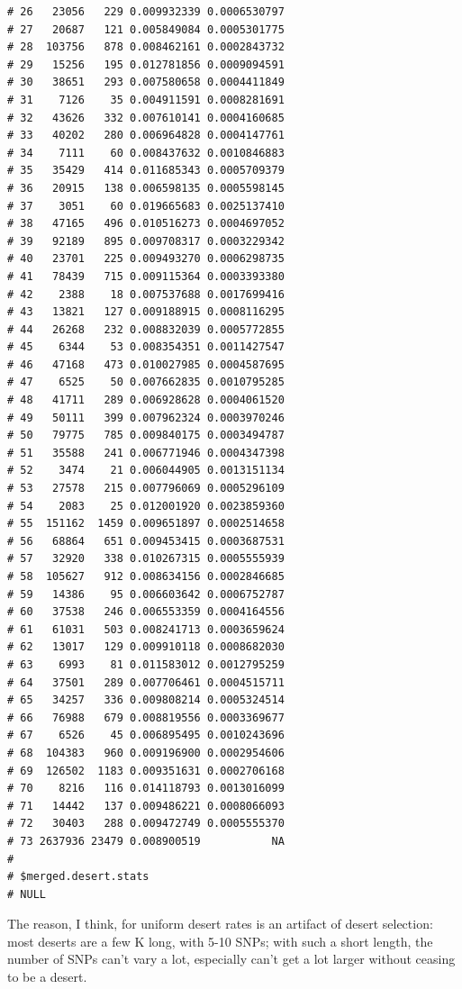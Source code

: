 \documentclass{article}\usepackage[]{graphicx}\usepackage[]{color}
\makeatletter
\newenvironment{kframe}{%
 \def\at@end@of@kframe{}%
 \ifinner\ifhmode%
  \def\at@end@of@kframe{\end{minipage}}%
  \begin{minipage}{\columnwidth}%
 \fi\fi%
 \def\FrameCommand##1{\hskip\@totalleftmargin \hskip-\fboxsep
 \colorbox{shadecolor}{##1}\hskip-\fboxsep
     \hskip-\linewidth \hskip-\@totalleftmargin \hskip\columnwidth}%
 \MakeFramed {\advance\hsize-\width
   \@totalleftmargin\z@ \linewidth\hsize
   \@setminipage}}%
 {\par\unskip\endMakeFramed%
 \at@end@of@kframe}
\newenvironment{knitrout}{}{} %
\makeatother
\begin{document}
\begin{knitrout}
\begin{kframe}
\begin{verbatim}
# 26   23056   229 0.009932339 0.0006530797
# 27   20687   121 0.005849084 0.0005301775
# 28  103756   878 0.008462161 0.0002843732
# 29   15256   195 0.012781856 0.0009094591
# 30   38651   293 0.007580658 0.0004411849
# 31    7126    35 0.004911591 0.0008281691
# 32   43626   332 0.007610141 0.0004160685
# 33   40202   280 0.006964828 0.0004147761
# 34    7111    60 0.008437632 0.0010846883
# 35   35429   414 0.011685343 0.0005709379
# 36   20915   138 0.006598135 0.0005598145
# 37    3051    60 0.019665683 0.0025137410
# 38   47165   496 0.010516273 0.0004697052
# 39   92189   895 0.009708317 0.0003229342
# 40   23701   225 0.009493270 0.0006298735
# 41   78439   715 0.009115364 0.0003393380
# 42    2388    18 0.007537688 0.0017699416
# 43   13821   127 0.009188915 0.0008116295
# 44   26268   232 0.008832039 0.0005772855
# 45    6344    53 0.008354351 0.0011427547
# 46   47168   473 0.010027985 0.0004587695
# 47    6525    50 0.007662835 0.0010795285
# 48   41711   289 0.006928628 0.0004061520
# 49   50111   399 0.007962324 0.0003970246
# 50   79775   785 0.009840175 0.0003494787
# 51   35588   241 0.006771946 0.0004347398
# 52    3474    21 0.006044905 0.0013151134
# 53   27578   215 0.007796069 0.0005296109
# 54    2083    25 0.012001920 0.0023859360
# 55  151162  1459 0.009651897 0.0002514658
# 56   68864   651 0.009453415 0.0003687531
# 57   32920   338 0.010267315 0.0005555939
# 58  105627   912 0.008634156 0.0002846685
# 59   14386    95 0.006603642 0.0006752787
# 60   37538   246 0.006553359 0.0004164556
# 61   61031   503 0.008241713 0.0003659624
# 62   13017   129 0.009910118 0.0008682030
# 63    6993    81 0.011583012 0.0012795259
# 64   37501   289 0.007706461 0.0004515711
# 65   34257   336 0.009808214 0.0005324514
# 66   76988   679 0.008819556 0.0003369677
# 67    6526    45 0.006895495 0.0010243696
# 68  104383   960 0.009196900 0.0002954606
# 69  126502  1183 0.009351631 0.0002706168
# 70    8216   116 0.014118793 0.0013016099
# 71   14442   137 0.009486221 0.0008066093
# 72   30403   288 0.009472749 0.0005555370
# 73 2637936 23479 0.008900519           NA
# 
# $merged.desert.stats
# NULL
\end{verbatim}
\end{kframe}
\end{knitrout}

The reason, I think, for uniform desert rates is an artifact of desert selection: most deserts are a few K long, with 5-10 SNPs; with such a short length, the number of SNPs can't vary a lot, especially can't get a lot larger without ceasing to be a desert.
\end{document}
